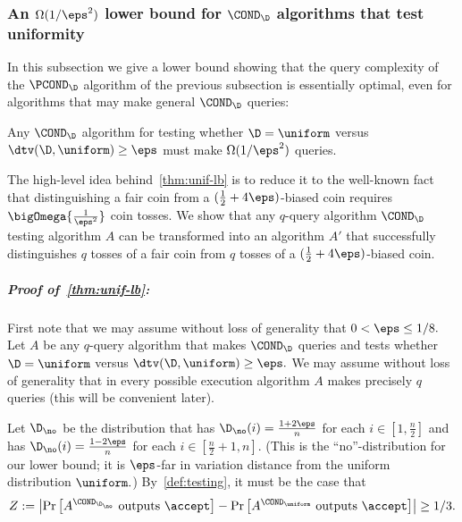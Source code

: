 \subsubsection{An \texorpdfstring{$\Omega(1/\eps^2)$}{Omega(1/eps2)} lower bound for \texorpdfstring{$\COND_\D$}{COND} algorithms that test uniformity} \label{ssec:unif-lb}

In this subsection we give a lower bound showing that
the query complexity of the $\PCOND_\D$ algorithm
of the previous subsection is essentially optimal, even for
algorithms that may make general $\COND_\D$ queries:

\begin{theorem} \label{thm:unif-lb}
Any $\COND_\D$ algorithm for testing whether $\D = \uniform$
versus $\dtv(\D,\uniform) \geq \eps$ must make $\Omega(1/\eps^2)$
queries.
\end{theorem}

The high-level idea behind~\cref{thm:unif-lb} is to
reduce it to the well-known fact that distinguishing a fair coin
from a $(\frac{1}{2} + 4\eps)$-biased coin requires $\bigOmega{\frac{1}{\eps^2}}$
coin tosses.  We show that any $q$-query algorithm $\COND_\D$ testing
algorithm $A$ can be transformed into an algorithm $A'$ that successfully
distinguishes $q$ tosses of a fair coin from $q$ tosses of a
$(\frac{1}{2} + 4 \eps)$-biased coin.

\medskip

\subparagraph{Proof of~\cref{thm:unif-lb}:}
First note that
we may assume without loss of generality that $0 < \eps \leq 1/8.$
Let $A$ be any $q$-query algorithm that makes $\COND_\D$ queries
and tests whether $\D = \uniform$ versus $\dtv(\D,\uniform) \geq \eps.$
We may assume without loss of generality that in every possible
execution algorithm $A$ makes precisely $q$ queries (this will be
convenient later).

Let $\D_{\text \no}$ be the distribution that has $\D_{\text \no}(i)=
\frac{1+2\eps}{n}$ for each $i \in \left[1,\frac{n}{2}\right]$ and
has $\D_{\text \no}(i) = \frac{1-2\eps}{n}$ for
each $i \in \left[\frac{n}{2}+1, n\right].$
(This is the ``no''-distribution for our lower bound; it is
$\eps$-far in variation
distance from the uniform distribution $\uniform.$)
By~\cref{def:testing}, it must be the case
that
\[
Z := \left|
\Pr\left[A^{\COND_{\D_{\text \no}}} \text{~outputs~}\accept\right] -
\Pr\left[A^{\COND_{\uniform}} \text{~outputs~}\accept\right]
\right| \geq 1/3.
\]

